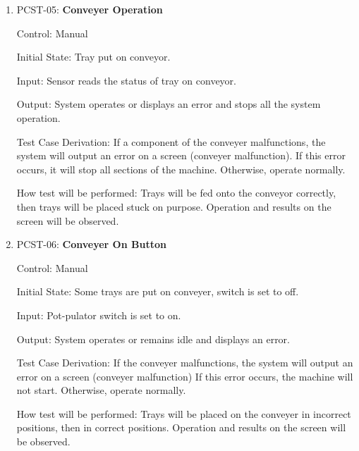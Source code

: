 \documentclass[12pt, titlepage]{article}
\begin{document}
\begin{enumerate}





\item {PCST-05: \textbf{Conveyer Operation }}

Control: Manual

Initial State: Tray put on conveyor.

Input: Sensor reads the status of tray on conveyor.

Output: System operates or displays an error and stops all the system operation. 

Test Case Derivation: If a component of the conveyer malfunctions, the system will output an error on a screen (conveyer malfunction). If this error occurs, it will stop all sections of the machine. Otherwise, operate normally. 

How test will be performed: Trays will be fed onto the conveyor correctly, then trays will be placed stuck on purpose. Operation and results on the screen will be observed. 
\\
\item {PCST-06: \textbf{Conveyer On Button }}

Control: Manual

Initial State: Some trays are put on conveyer, switch is set to off.

Input: Pot-pulator switch is set to on.

Output: System operates or remains idle and displays an error. 

Test Case Derivation: If the conveyer malfunctions, the system will output an error on a screen (conveyer malfunction) If this error occurs, the machine will not start. Otherwise, operate normally. 

How test will be performed: Trays will be placed on the conveyer in incorrect positions, then in correct positions. Operation and results on the screen will be observed.  
\\


\end{enumerate}
\end{document}
